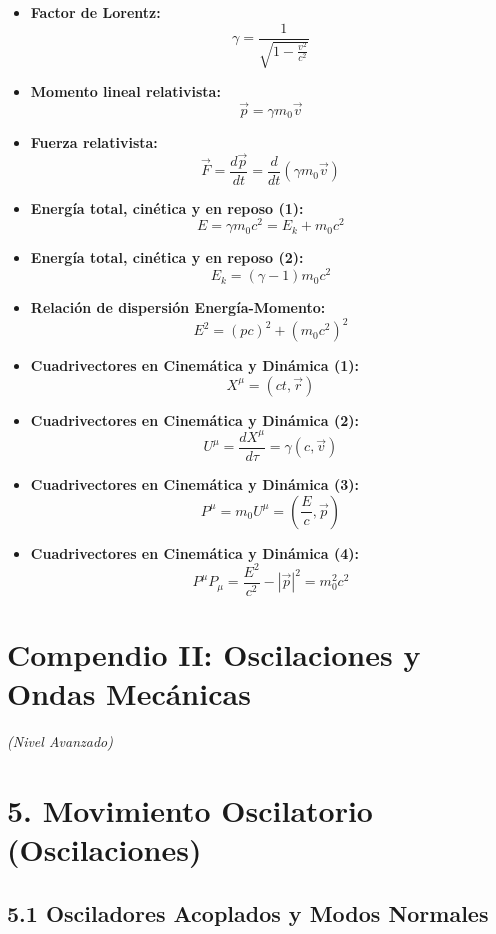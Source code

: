 \documentclass[11pt,a4paper]{article}
\begin{document}
\begin{itemize}
  \item \textbf{Factor de Lorentz:}
  \[
    \gamma = \frac{1}{\sqrt{1 - \frac{v^2}{c^2}}}
  \]
  \item \textbf{Momento lineal relativista:}
  \[
    \vec{p} = \gamma m_0 \vec{v}
  \]
  \item \textbf{Fuerza relativista:}
  \[
    \vec{F} = \frac{d\vec{p}}{dt} = \frac{d}{dt}(\gamma m_0 \vec{v})
  \]
  \item \textbf{Energía total, cinética y en reposo (1):}
  \[
    E = \gamma m_0 c^2 = E_k + m_0 c^2
  \]
  \item \textbf{Energía total, cinética y en reposo (2):}
  \[
    E_k = (\gamma - 1) m_0 c^2
  \]
  \item \textbf{Relación de dispersión Energía-Momento:}
  \[
    E^2 = (p c)^2 + (m_0 c^2)^2
  \]
  \item \textbf{Cuadrivectores en Cinemática y Dinámica (1):}
  \[
    X^\mu = (ct, \vec{r})
  \]
  \item \textbf{Cuadrivectores en Cinemática y Dinámica (2):}
  \[
    U^\mu = \frac{dX^\mu}{d\tau} = \gamma(c, \vec{v})
  \]
  \item \textbf{Cuadrivectores en Cinemática y Dinámica (3):}
  \[
    P^\mu = m_0 U^\mu = \left( \frac{E}{c}, \vec{p} \right)
  \]
  \item \textbf{Cuadrivectores en Cinemática y Dinámica (4):}
  \[
    P^\mu P_\mu = \frac{E^2}{c^2} - |\vec{p}|^2 = m_0^2 c^2
  \]
\end{itemize}

\section*{Compendio II: Oscilaciones y Ondas Mecánicas}

\textit{(Nivel Avanzado)}

\section*{5. Movimiento Oscilatorio (Oscilaciones)}

\subsection*{5.1 Osciladores Acoplados y Modos Normales}
\end{document}
